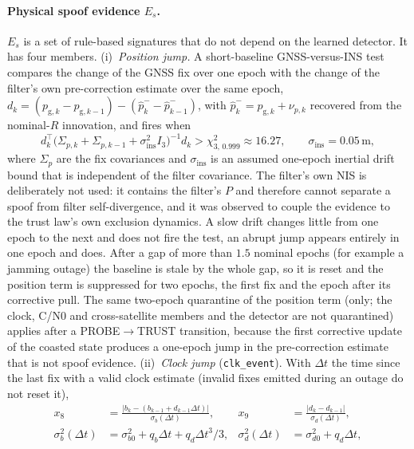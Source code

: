 \documentclass[journal]{IEEEtran}
\begin{document}
\paragraph{Physical spoof evidence $E_s$.}
$E_s$ is a set of rule-based signatures that do not depend on the learned detector. It has four members.
(i)~\emph{Position jump.} A short-baseline GNSS-versus-INS test compares the change of the GNSS fix over one
epoch with the change of the filter's own pre-correction estimate over the same epoch,
$d_k = (p_{\mathrm{g},k} - p_{\mathrm{g},k-1}) - (\hat p^{-}_k - \hat p^{-}_{k-1})$, with
$\hat p^{-}_k = p_{\mathrm{g},k} + \nu_{p,k}$ recovered from the nominal-$R$ innovation, and fires when
\begin{equation}
d_k^{\top}\big(\Sigma_{p,k} + \Sigma_{p,k-1} + \sigma_{\mathrm{ins}}^2 I_3\big)^{-1} d_k > \chi^2_{3,\,0.999} \approx 16.27,
\qquad \sigma_{\mathrm{ins}} = 0.05\,\mathrm{m},
\label{eq:jump}
\end{equation}
where $\Sigma_p$ are the fix covariances and $\sigma_{\mathrm{ins}}$ is an assumed one-epoch inertial drift
bound that is independent of the filter covariance. The filter's own NIS is deliberately not used: it
contains the filter's $P$ and therefore cannot separate a spoof from filter self-divergence, and it was
observed to couple the evidence to the trust law's own exclusion dynamics. A slow drift changes little from one
epoch to the next and does not fire the test, an abrupt jump appears entirely in one epoch and does. After a
gap of more than $1.5$ nominal epochs (for example a jamming outage) the baseline is stale by the whole gap, so
it is reset and the position term is suppressed for two epochs, the first fix and the epoch after its
corrective pull. The same two-epoch quarantine of the position term (only; the clock, C/N0 and cross-satellite members
and the detector are not quarantined) applies after a PROBE$\rightarrow$TRUST transition, because the first corrective
update of the coasted state produces a one-epoch jump in the pre-correction estimate that is not spoof evidence. (ii)~\emph{Clock jump} (\texttt{clk\_event}). With $\Delta t$ the time since the last fix with a valid clock estimate (invalid fixes emitted during an outage do not reset it),
\begin{align}
x_8 &= \frac{\lvert b_k - (b_{k-1} + d_{k-1}\Delta t)\rvert}{\sigma_b(\Delta t)}, &
x_9 &= \frac{\lvert d_k - d_{k-1}\rvert}{\sigma_d(\Delta t)}, \nonumber\\
\sigma_b^2(\Delta t) &= \sigma_{b0}^2 + q_b\Delta t + q_d\Delta t^3/3, &
\sigma_d^2(\Delta t) &= \sigma_{d0}^2 + q_d\Delta t, \label{eq:clkjump}
\end{align}
\end{document}
